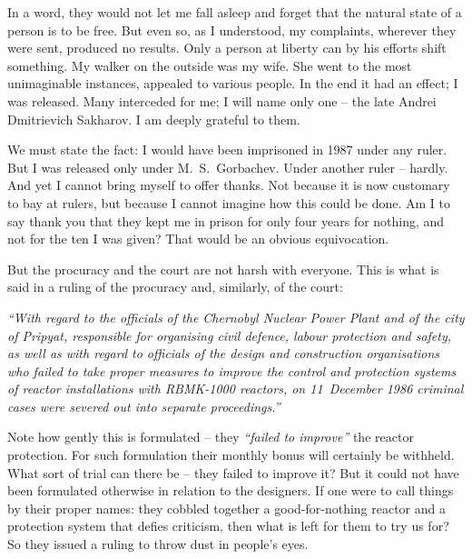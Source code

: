 \documentclass[openright]{bookest}
\begin{document}
In a word, they would not let me fall asleep and forget that the natural state of a person is to be free. But even so, as I understood, my complaints, wherever they were sent, produced no results. Only a person at liberty can by his efforts shift something. My walker on the outside was my wife. She went to the most unimaginable instances, appealed to various people. In the end it had an effect; I was released. Many interceded for me; I will name only one -- the late Andrei Dmitrievich Sakharov. I am deeply grateful to them.

We must state the fact: I would have been imprisoned in 1987 under any ruler. But I was released only under M.~S.~Gorbachev. Under another ruler -- hardly. And yet I cannot bring myself to offer thanks. Not because it is now customary to bay at rulers, but because I cannot imagine how this could be done. Am I to say thank you that they kept me in prison for only four years for nothing, and not for the ten I was given? That would be an obvious equivocation.

But the procuracy and the court are not harsh with everyone. This is what is said in a ruling of the procuracy and, similarly, of the court:

\begin{personal}
\textit{``With regard to the officials of the Chernobyl Nuclear Power Plant and of the city of Pripyat, responsible for organising civil defence, labour protection and safety, as well as with regard to officials of the design and construction organisations who failed to take proper measures to improve the control and protection systems of reactor installations with RBMK-1000 reactors, on 11~December 1986 criminal cases were severed out into separate proceedings.''}
\end{personal}

Note how gently this is formulated -- they \textit{``failed to improve''} the reactor protection. For such formulation their monthly bonus will certainly be withheld. What sort of trial can there be -- they failed to improve it? But it could not have been formulated otherwise in relation to the designers. If one were to call things by their proper names: they cobbled together a good-for-nothing reactor and a protection system that defies criticism, then what is left for them to try us for? So they issued a ruling to throw dust in people's eyes.

\end{document}
